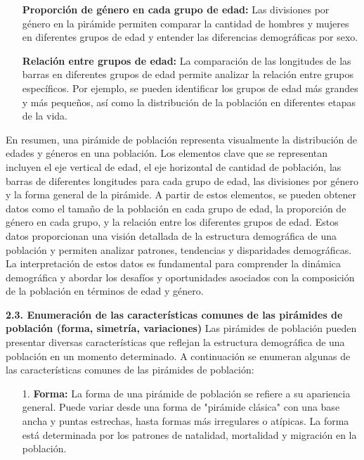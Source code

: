 \documentclass[8pt,a4paper]{beamer}
\begin{document}
{\begin{frame}{}
\begin{block}{}
\justifying
\begin{itemize}
\justifying
\item[\ding{65}] \textbf{Proporción de género en cada grupo de edad:} Las divisiones por género en la pirámide permiten comparar la cantidad de hombres y mujeres en diferentes grupos de edad y entender las diferencias demográficas por sexo.
\item[\ding{65}] \textbf{Relación entre grupos de edad:} La comparación de las longitudes de las barras en diferentes grupos de edad permite analizar la relación entre grupos específicos. Por ejemplo, se pueden identificar los grupos de edad más grandes y más pequeños, así como la distribución de la población en diferentes etapas de la vida.
\end{itemize}
En resumen, una pirámide de población representa visualmente la distribución de edades y géneros en una población. Los elementos clave que se representan incluyen el eje vertical de edad, el eje horizontal de cantidad de población, las barras de diferentes longitudes para cada grupo de edad, las divisiones por género y la forma general de la pirámide. A partir de estos elementos, se pueden obtener datos como el tamaño de la población en cada grupo de edad, la proporción de género en cada grupo, y la relación entre los diferentes grupos de edad. Estos datos proporcionan una visión detallada de la estructura demográfica de una población y permiten analizar patrones, tendencias y disparidades demográficas. La interpretación de estos datos es fundamental para comprender la dinámica demográfica y abordar los desafíos y oportunidades asociados con la composición de la población en términos de edad y género.
\end{block}
\end{frame}


\begin{frame}{}
\begin{block}{\textbf{2.3. Enumeración de las características comunes de las pirámides de población (forma, simetría, variaciones)}}
\justifying
Las pirámides de población pueden presentar diversas características que reflejan la estructura demográfica de una población en un momento determinado. A continuación se enumeran algunas de las características comunes de las pirámides de población:
\begin{enumerate}
\justifying
\item[1.] \textbf{Forma:} La forma de una pirámide de población se refiere a su apariencia general. Puede variar desde una forma de "pirámide clásica" con una base ancha y puntas estrechas, hasta formas más irregulares o atípicas. La forma está determinada por los patrones de natalidad, mortalidad y migración en la población.


\end{enumerate}
\end{block}
\end{frame}}
\end{document}
